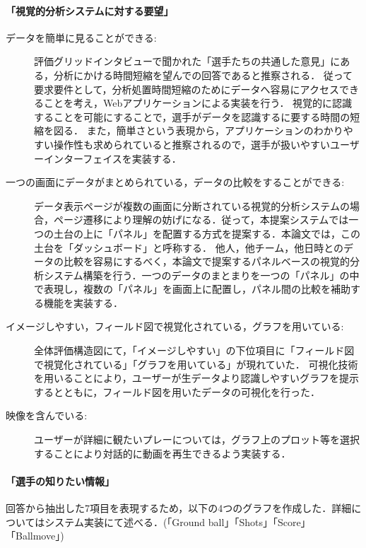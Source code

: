 \documentclass[sotsuron]{kuee}
\begin{document}
					\paragraph {「視覚的分析システムに対する要望」}
						\begin{description}
							\item [データを簡単に見ることができる:]
							評価グリッドインタビューで聞かれた「選手たちの共通した意見」にある，分析にかける時間短縮を望んでの回答であると推察される．
							従って要求要件として，分析処置時間短縮のためにデータへ容易にアクセスできることを考え，Webアプリケーションによる実装を行う．
							視覚的に認識することを可能にすることで，選手がデータを認識するに要する時間の短縮を図る．
							また，簡単さという表現から，アプリケーションのわかりやすい操作性も求められていると推察されるので，選手が扱いやすいユーザーインターフェイスを実装する．
							
							\item [一つの画面にデータがまとめられている，データの比較をすることができる:]
							データ表示ページが複数の画面に分断されている視覚的分析システムの場合，ページ遷移により理解の妨げになる．従って，本提案システムでは一つの土台の上に「パネル」を配置する方式を提案する．本論文では，この土台を「ダッシュボード」と呼称する．
							他人，他チーム，他日時とのデータの比較を容易にするべく，本論文で提案するパネルベースの視覚的分析システム構築を行う．一つのデータのまとまりを一つの「パネル」の中で表現し，複数の「パネル」を画面上に配置し，パネル間の比較を補助する機能を実装する．
							
							\item [イメージしやすい，フィールド図で視覚化されている，グラフを用いている:]
							全体評価構造図にて，「イメージしやすい」の下位項目に「フィールド図で視覚化されている」「グラフを用いている」が現れていた．
							可視化技術を用いることにより，ユーザーが生データより認識しやすいグラフを提示するとともに，フィールド図を用いたデータの可視化を行った．
							
							\item [映像を含んでいる:]
							ユーザーが詳細に観たいプレーについては，グラフ上のプロット等を選択することにより対話的に動画を再生できるよう実装する．
						\end{description}
					\paragraph {「選手の知りたい情報」}
						回答から抽出した7項目を表現するため，以下の4つのグラフを作成した．詳細についてはシステム実装にて述べる．(「Ground ball」「Shots」「Score」「Ballmove」)
\end{document}
